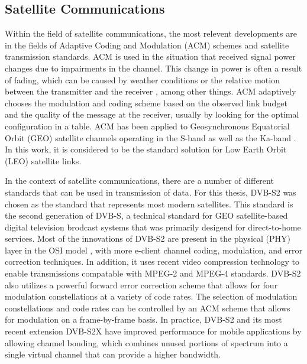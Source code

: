\subsection{Satellite Communications}
\par Within the field of satellite communications, the most relevent developments are in the fields of Adaptive Coding and Modulation (ACM) schemes and satellite transmission standards.  ACM is used in the situation that received signal power changes due to impairments in the channel\cite{acm_explained}. This change in power is often a result of fading, which can be caused by weather conditions or the relative motion between the transmitter and the receiver \cite{paulo17}, among other things. ACM adaptively chooses the modulation and coding scheme based on the observed link budget and the quality of the message at the receiver, usually by looking for the optimal configuration in a table. ACM has been applied to 
Geosynchronous Equatorial Orbit (GEO) satellite channels operating in the S-band \cite{paulo18} as well as the Ka-band \cite{paulo19}. In this work, it is considered to be the standard solution for Low Earth Orbit (LEO) satellite links.  
\par In the context of satellite communications, there are a number of different standards that can be used in transmission of data. For this thesis, DVB-S2 \cite{paulo21} was chosen as the standard that represents most modern satellites. This standard is the second generation of DVB-S, a technical standard for GEO satellite-based digital television brodcast systems that was primarily desigend for direct-to-home services. Most of the innovations of DVB-S2 are present in the physical (PHY) layer in the OSI model \cite{OSIModel}, with more e-client channel coding, modulation, and error correction techniques. In addition, it uses recent video compression technology to enable transmissions compatable with MPEG-2 and MPEG-4 \cite{mp4_std} standards. DVB-S2 also utilizes a powerful forward error correction scheme that allows for four modulation constellations at a variety of code rates. The selection of modulation constellations and code rates can be controlled by an ACM scheme that allows for modulation on a frame-by-frame basis. In practice, DVB-S2 and its most recent extension DVB-S2X \cite{paulo22} have improved performance for mobile applications by allowing channel bonding, which combines unused portions of spectrum into a single virtual channel that can provide a higher bandwidth.
